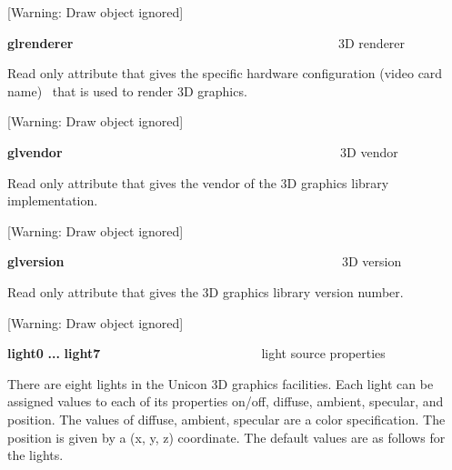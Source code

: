 \documentclass[letterpaper]{article}
\begin{document}
[Warning: Draw object ignored]

{
\textsf{\textbf{glrenderer\ \ \ \ \ \ \ \ \ \ \ \ \ \  \ \ \ \ \ \ \ \ \ \ \  \ \ \ \ \ \ }}\ \ \  \ \ \ 3D renderer}


\bigskip

{
Read only attribute that gives the specific hardware configuration (video card name) \ that is used to render 3D
graphics.}

[Warning: Draw object ignored]

{
\textsf{\textbf{glvendor\ \ \ \ \ \ \ \ \ \ \ \ \ \  \ \ \ \ \ \ \ \ \ \ \  \ \ \ \ \ \ }}\ \ \  \ \ \ \ \ 3D vendor}


\bigskip

{
Read only attribute that gives the vendor of the 3D graphics library implementation.}

[Warning: Draw object ignored]

{
\textsf{\textbf{glversion\ \ \ \ \ \ \ \ \ \ \ \ \ \  \ \ \ \ \ \ \ \ \ \ \  \ \ \ \ \ \ }}\ \ \  \ \ \ \ \ 3D version}


\bigskip

{
Read only attribute that gives the 3D graphics library version number.}


\bigskip

[Warning: Draw object ignored]

{
\textsf{\textbf{light0}}\textbf{ ... }\textsf{\textbf{light7\ \ \ \ \ \ \ \ \ \ \ \  \ \ \ \ \ \ \ \ \ \ }}light source
properties}


\bigskip

{
There are eight lights in the Unicon 3D graphics facilities. Each light can be assigned values to each of its properties
on/off, diffuse, ambient, specular, and position. The values of diffuse, ambient, specular are a color specification.
The position is given by a (x, y, z) coordinate. The default values are as follows for the lights.}


\bigskip


\bigskip
\end{document}
